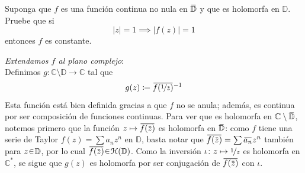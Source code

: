 \setcounter{eje}{14}
\begin{ejer}
Suponga que $f$ es una función continua no nula en $\ubar{\mathbb{D}}$ y que es holomorfa en $\mathbb{D}$. Pruebe que si
\[ |z| = 1 \implies|f(z)| = 1 \]
entonces $f$ es constante.\par\noindent
[Sugerencia: Extienda $f$ a todo $\mathbb{C}$ mediante $f(z) = {1}/{\ubar{f(1/\ubar{z})}}$ con $|z| > 1$, y argumente como en el principio de reflexión de Schwarz.]
\end{ejer}
\begin{sol}
\emph{Extendamos $f$ al plano complejo}:\\
Definimos $g \colon \mathbb{C}\setminus \mathbb{D} \to \mathbb{C}$ tal que
\[
g(z) \coloneq \ubar{f(\nicefrac{1}{\ubar{z}})}^{-1}
\]
Esta función está bien definida gracias a que $f$ no se anula; además, es continua por ser composición de funciones continuas. Para ver que es holomorfa en $\mathbb{C}\setminus\ubar{\mathbb{D}}$, notemos primero que la función $z \mapsto\ubar{f(\ubar{z})}$ es holomorfa en $\ubar{\mathbb{D}}$: como $f$ tiene una serie de Taylor $f(z) = \sum a_nz^n$ en $\mathbb{D}$, basta notar que $\ubar{f(\ubar{z})} = \sum \ubar{a_n}z^n$ también para $z\en\mathbb{D}$, por lo cual $\ubar{f(\ubar{z})}\en\mathcal{H}(\mathbb{D})$. Como la inversión $\iota \colon z \mapsto\nicefrac{1}{z}$ es holomorfa en $\mathbb{C}^*$, se sigue que $g(z)$ es holomorfa por ser conjugación de $\ubar{f(\ubar{z})}$ con $\iota$. 


\end{sol}
